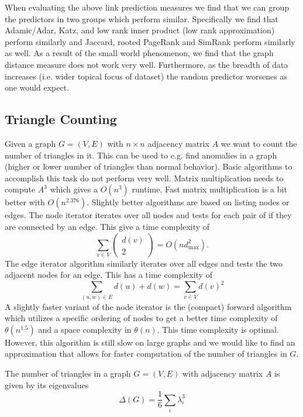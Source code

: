 \bigskip

When evaluating the above link prediction measures we find that we can group the predictors in two groups which perform similar. Specifically we find that Adamic/Adar, Katz, and low rank inner product (low rank approximation) perform similarly and Jaccard, rooted PageRank and SimRank perform similarly as well. As a result of the small world phenomenon, we find that the graph distance measure does not work very well. Furthermore, as the breadth of data increases (i.e. wider topical focus of dataset) the random predictor worsenes as one would expect.

\subsection{Triangle Counting}
\bigskip

Given a graph $G = (V,E)$ with $n \times n$ adjacency matrix $A$ we want to count the number of triangles in it. This can be used to e.g. find anomalies in a graph (higher or lower number of triangles than normal behavior). Basic algorithms to accomplish this task do not perform very well. Matrix multiplication needs to compute $A^3$ which gives a $O(n^3)$ runtime. Fast matrix multiplication is a bit better with $O(n^{2.376})$. Slightly better algorithms are based on listing nodes or edges. The node iterator iterates over all nodes and tests for each pair of if they are connected by an edge. This give a time complexity of
$$
\sum_{v \in V} \begin{pmatrix} d(v) \\ 2 \end{pmatrix} = O(nd_{\text{max}}^2).
$$
The edge iterator algorithm similarly iterates over all edges and tests the two adjacent nodes for an edge. This has a time complexity of
$$
\sum_{(u,w) \in E} d(u) + d(w) = \sum_{v \in V} d(v)^2
$$
A slightly faster variant of the node iterator is the (compact) forward algorithm which utilizes a specific ordering of nodes to get a better time complexity of $\theta(n^{1.5})$ and a space complexity in $\theta(n)$. This time complexity is optimal. However, this algorithm is still slow on large graphs and we would like to find an approximation that allows for faster computation of the number of triangles in $G$.

\bigskip

\begin{theorem}[EigenTriangle]
The number of triangles in a graph $G=(V,E)$ with adjacency matrix $A$ is given by its eigenvalues
$$
\Delta(G) = \frac{1}{6} \sum_i \lambda_i^3
$$
\end{theorem}

